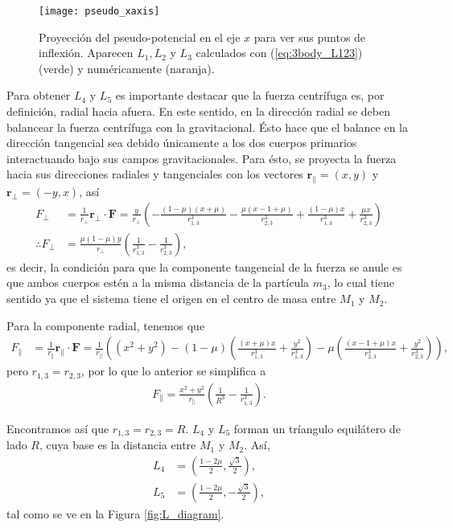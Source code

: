 \begin{figure}[h!]
 \centering
 \texttt{[image: pseudo\_xaxis]}
 \caption{Proyección del pseudo-potencial en el eje $x$ para ver sus puntos de inflexión. Aparecen $L_1, L_2$ y $L_3$ calculados con (\ref{eq:3body_L123}) (verde) y numéricamente (naranja).}
 \label{fig:3body_pseudo_xaxis}
\end{figure}

Para obtener $L_4$ y $L_5$ es importante destacar que la fuerza centrífuga es, por definición, radial hacia afuera. En este sentido, en la dirección radial se deben balancear la fuerza centrífuga con la gravitacional. Ésto hace que el balance en la dirección tangencial sea debido únicamente a los dos cuerpos primarios interactuando bajo sus campos gravitacionales. Para ésto, se proyecta la fuerza hacia sus direcciones radiales y tangenciales con los vectores $\mathbf{r}_{\parallel} = (x,y)$ y $\mathbf{r}_{\bot} = (-y,x)$, así
\begin{align*}
 F_{\bot} &= \frac{1}{r_{\bot}} \mathbf{r}_{\bot} \cdot \mathbf{F} = \frac{y}{r_{\bot}} \left( - \frac{(1-\mu)(x + \mu)}{ r_{1,3}^3 } - \frac{\mu(x - 1 +\mu )}{ r_{2,3}^3 } + \frac{(1-\mu)x}{ r_{1,3}^3 } + \frac{\mu x}{ r_{2,3}^3 } \right) \\
 \therefore F_{\bot} &= \frac{ \mu(1-\mu) y}{r_{\bot}} \left( \frac{1}{r_{1,3}^3} - \frac{1}{r_{2,3}^3} \right),
\end{align*}
es decir, la condición para que la componente tangencial de la fuerza se anule es que ambos cuerpos estén a la misma distancia de la partícula $m_3$, lo cual tiene sentido ya que el sistema tiene el origen en el centro de masa entre $M_1$ y $M_2$. 

Para la componente radial, tenemos que
\begin{align*}
 F_{\parallel} &= \frac{1}{r_{\parallel}} \mathbf{r}_{\parallel} \cdot \mathbf{F} = \frac{1}{r_\parallel} \left( (x^2 + y^2) -  (1-\mu) \left( \frac{(x+ \mu)x}{r_{1,3}^3} + \frac{y^2}{r_{1,3}^3} \right) - \mu \left( \frac{(x - 1 +\mu) x}{r_{2,3}^3} + \frac{y^2}{r_{2,3}^3} \right) \right),
\end{align*}
pero $r_{1,3} = r_{2,3}$, por lo que lo anterior se simplifica a 
\begin{align*}
 F_{\parallel} = \frac{x^2 + y^2}{r_\parallel} \left( \frac{1}{R^3} - \frac{1}{r_{1,3}^3} \right).
\end{align*}

Encontramos así que $r_{1,3} = r_{2,3} = R$. $L_4$ y $L_5$ forman un tríangulo equilátero de lado $R$, cuya base es la distancia entre $M_1$ y $M_2$. Así,
\begin{align}
 L_4 &= \left( \frac{1 - 2\mu}{2}, \frac{\sqrt{3}}{2} \right), \\
 L_5 &= \left( \frac{1 - 2\mu}{2} , -\frac{\sqrt{3}}{2} \right),
 \label{eq:L4_L5}
\end{align} 
tal como se ve en la Figura \ref{fig:L_diagram}.

